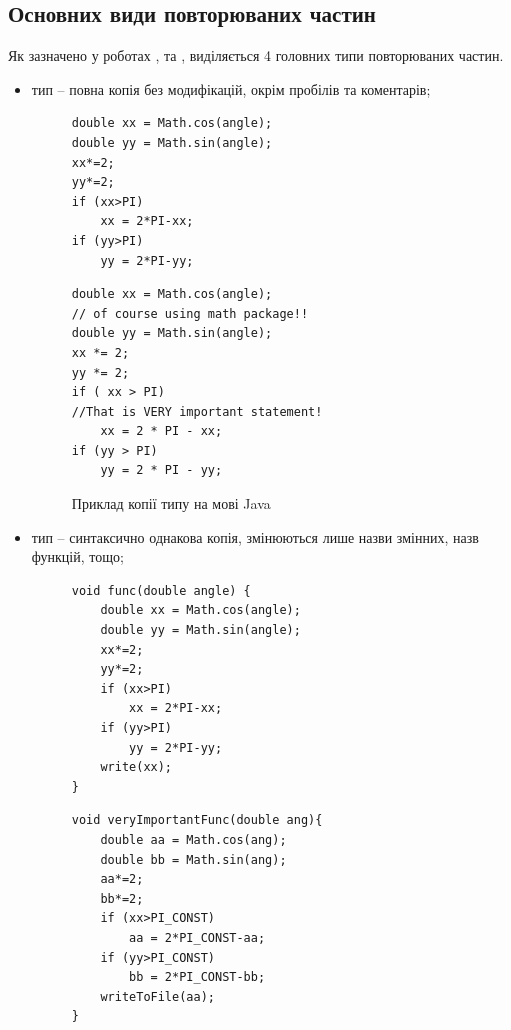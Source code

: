 \documentclass[a4paper, 14pt]{article}
\newcommand{\RNum}[1]{\uppercase\expandafter{\romannumeral #1\relax}}
\begin{document}
\subsection{Основних види повторюваних частин}
Як зазначено у роботах \cite{Gautam16}, \cite{Dang15} та \cite{Thummalapenta10}, виділяється 4 головних типи повторюваних частин. 
\begin{itemize}
\item \RNum{1} тип -- повна копія без модифікацій, окрім пробілів та коментарів;
\begin{figure}[!htb]
\centering
\begin{minipage}[t]{.45\textwidth}
\begin{lstlisting}[frame=none]
double xx = Math.cos(angle);
double yy = Math.sin(angle);
xx*=2;
yy*=2;	
if (xx>PI)
	xx = 2*PI-xx;
if (yy>PI)
	yy = 2*PI-yy;
\end{lstlisting}
\end{minipage}
\begin{minipage}[t]{.45\textwidth}
\begin{lstlisting}[frame=none]
double xx = Math.cos(angle);
// of course using math package!!
double yy = Math.sin(angle);
xx *= 2;
yy *= 2;	
if ( xx > PI)
//That is VERY important statement!
	xx = 2 * PI - xx; 
if (yy > PI)
	yy = 2 * PI - yy;
\end{lstlisting}
\end{minipage}
\caption*{Приклад копії \RNum{1} типу на мові Java}
\end{figure}
\item \RNum{2} тип -- синтаксично однакова копія, змінюються лише назви змінних, назв функцій, тощо;
\begin{figure}[!htb]
\centering
\begin{minipage}[t]{.45\textwidth}
\begin{lstlisting}[frame=none]
void func(double angle) {
	double xx = Math.cos(angle);
	double yy = Math.sin(angle);
	xx*=2;
	yy*=2;	
	if (xx>PI)
		xx = 2*PI-xx;
	if (yy>PI)
		yy = 2*PI-yy;
	write(xx);
}
\end{lstlisting}
\end{minipage}
\begin{minipage}[t]{.45\textwidth}
\begin{lstlisting}[frame=none]
void veryImportantFunc(double ang){
	double aa = Math.cos(ang);
	double bb = Math.sin(ang);
	aa*=2;
	bb*=2;	
	if (xx>PI_CONST)
		aa = 2*PI_CONST-aa;
	if (yy>PI_CONST)
		bb = 2*PI_CONST-bb;
	writeToFile(aa);
}
\end{lstlisting}

\end{minipage}
\end{figure}
\end{itemize}
\end{document}

